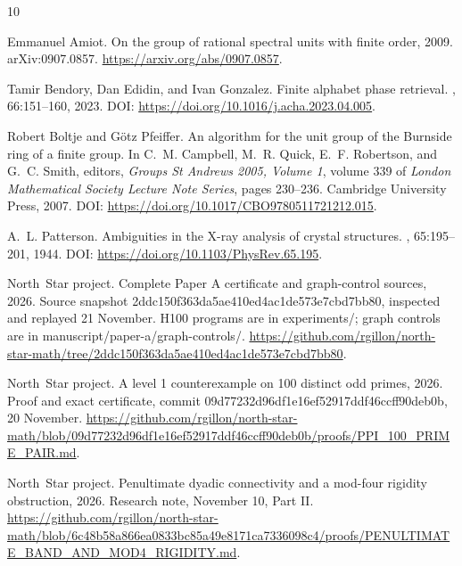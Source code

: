 \documentclass[11pt]{article}
\numberwithin{equation}{section}
\theoremstyle{definition}
\theoremstyle{remark}
\begin{document}
\begin{thebibliography}{10}

Emmanuel Amiot.
\newblock On the group of rational spectral units with finite order, 2009.
\newblock arXiv:0907.0857. \url{https://arxiv.org/abs/0907.0857}.

Tamir Bendory, Dan Edidin, and Ivan Gonzalez.
\newblock Finite alphabet phase retrieval.
, 66:151--160, 2023.
\newblock DOI: \url{https://doi.org/10.1016/j.acha.2023.04.005}.

Robert Boltje and G{\"o}tz Pfeiffer.
\newblock An algorithm for the unit group of the {Burnside} ring of a finite
  group.
\newblock In C.~M. Campbell, M.~R. Quick, E.~F. Robertson, and G.~C. Smith,
  editors, {\em Groups St Andrews 2005, Volume 1}, volume 339 of {\em London
  Mathematical Society Lecture Note Series}, pages 230--236. Cambridge
  University Press, 2007.
\newblock DOI: \url{https://doi.org/10.1017/CBO9780511721212.015}.

A.~L. Patterson.
\newblock Ambiguities in the {X}-ray analysis of crystal structures.
, 65:195--201, 1944.
\newblock DOI: \url{https://doi.org/10.1103/PhysRev.65.195}.

North~Star project.
\newblock Complete {Paper A} certificate and graph-control sources, 2026.
\newblock Source snapshot 2ddc150f363da5ae410ed4ac1de573e7cbd7bb80, inspected
  and replayed 21 November. H100 programs are in experiments/; graph controls
  are in manuscript/paper-a/graph-controls/.
  \url{https://github.com/rgillon/north-star-math/tree/2ddc150f363da5ae410ed4ac1de573e7cbd7bb80}.

North~Star project.
\newblock A level 1 counterexample on 100 distinct odd primes, 2026.
\newblock Proof and exact certificate, commit
  09d77232d96df1e16ef52917ddf46ccff90deb0b, 20 November.
  \url{https://github.com/rgillon/north-star-math/blob/09d77232d96df1e16ef52917ddf46ccff90deb0b/proofs/PPI_100_PRIME_PAIR.md}.

North~Star project.
\newblock Penultimate dyadic connectivity and a mod-four rigidity obstruction,
  2026.
\newblock Research note, November 10, Part II.
  \url{https://github.com/rgillon/north-star-math/blob/6c48b58a866ea0833bc85a49e8171ca7336098c4/proofs/PENULTIMATE_BAND_AND_MOD4_RIGIDITY.md}.


\end{thebibliography}
\end{document}

